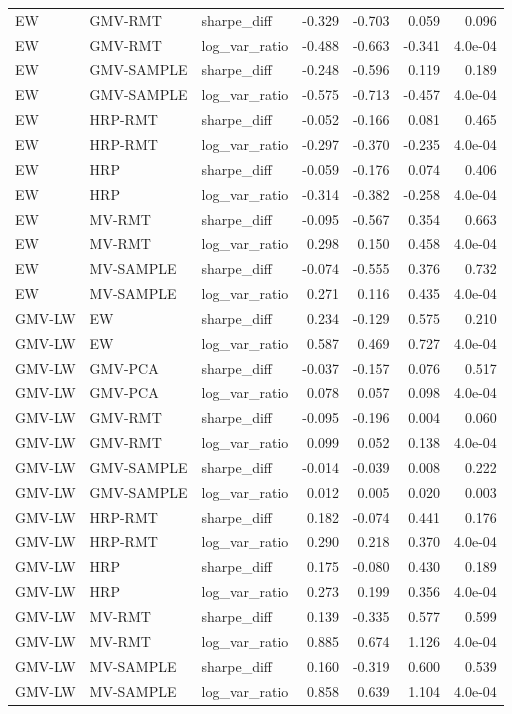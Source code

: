 \begin{table}[t]
{\begin{tabular}{lllrrrr}
EW & GMV-RMT & sharpe\_diff & -0.329 & -0.703 & 0.059 & 0.096 \\
EW & GMV-RMT & log\_var\_ratio & -0.488 & -0.663 & -0.341 & 4.0e-04 \\
EW & GMV-SAMPLE & sharpe\_diff & -0.248 & -0.596 & 0.119 & 0.189 \\
EW & GMV-SAMPLE & log\_var\_ratio & -0.575 & -0.713 & -0.457 & 4.0e-04 \\
EW & HRP-RMT & sharpe\_diff & -0.052 & -0.166 & 0.081 & 0.465 \\
EW & HRP-RMT & log\_var\_ratio & -0.297 & -0.370 & -0.235 & 4.0e-04 \\
EW & HRP & sharpe\_diff & -0.059 & -0.176 & 0.074 & 0.406 \\
EW & HRP & log\_var\_ratio & -0.314 & -0.382 & -0.258 & 4.0e-04 \\
EW & MV-RMT & sharpe\_diff & -0.095 & -0.567 & 0.354 & 0.663 \\
EW & MV-RMT & log\_var\_ratio & 0.298 & 0.150 & 0.458 & 4.0e-04 \\
EW & MV-SAMPLE & sharpe\_diff & -0.074 & -0.555 & 0.376 & 0.732 \\
EW & MV-SAMPLE & log\_var\_ratio & 0.271 & 0.116 & 0.435 & 4.0e-04 \\
GMV-LW & EW & sharpe\_diff & 0.234 & -0.129 & 0.575 & 0.210 \\
GMV-LW & EW & log\_var\_ratio & 0.587 & 0.469 & 0.727 & 4.0e-04 \\
GMV-LW & GMV-PCA & sharpe\_diff & -0.037 & -0.157 & 0.076 & 0.517 \\
GMV-LW & GMV-PCA & log\_var\_ratio & 0.078 & 0.057 & 0.098 & 4.0e-04 \\
GMV-LW & GMV-RMT & sharpe\_diff & -0.095 & -0.196 & 0.004 & 0.060 \\
GMV-LW & GMV-RMT & log\_var\_ratio & 0.099 & 0.052 & 0.138 & 4.0e-04 \\
GMV-LW & GMV-SAMPLE & sharpe\_diff & -0.014 & -0.039 & 0.008 & 0.222 \\
GMV-LW & GMV-SAMPLE & log\_var\_ratio & 0.012 & 0.005 & 0.020 & 0.003 \\
GMV-LW & HRP-RMT & sharpe\_diff & 0.182 & -0.074 & 0.441 & 0.176 \\
GMV-LW & HRP-RMT & log\_var\_ratio & 0.290 & 0.218 & 0.370 & 4.0e-04 \\
GMV-LW & HRP & sharpe\_diff & 0.175 & -0.080 & 0.430 & 0.189 \\
GMV-LW & HRP & log\_var\_ratio & 0.273 & 0.199 & 0.356 & 4.0e-04 \\
GMV-LW & MV-RMT & sharpe\_diff & 0.139 & -0.335 & 0.577 & 0.599 \\
GMV-LW & MV-RMT & log\_var\_ratio & 0.885 & 0.674 & 1.126 & 4.0e-04 \\
GMV-LW & MV-SAMPLE & sharpe\_diff & 0.160 & -0.319 & 0.600 & 0.539 \\
GMV-LW & MV-SAMPLE & log\_var\_ratio & 0.858 & 0.639 & 1.104 & 4.0e-04 \\
\bottomrule
\end{tabular}}
\end{table}
